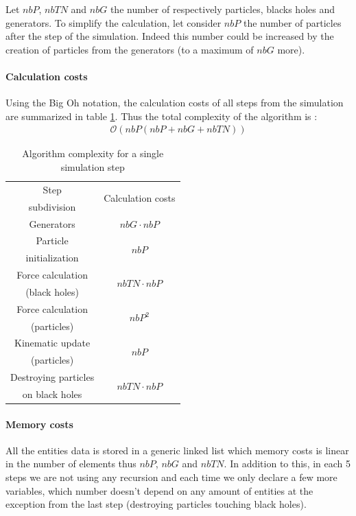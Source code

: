 \documentclass[a4paper]{article} %
\begin{document}
\begin{multicols*}{2}
Let $nbP$, $nbTN$ and $nbG$ the number of respectively particles, blacks holes and generators.
To simplify the calculation, let consider $nbP$ the number of particles after the step of the simulation.
Indeed this number could be increased by the creation of particles from the generators (to a maximum of $nbG$ more).



\paragraph{Calculation costs}
Using the Big Oh notation, the calculation costs of all steps from the simulation
are summarized in table \ref{tab-calc}. Thus the total complexity of the algorithm is :
\begin{align}
\mathcal{O}(nbP (nbP + nbG + nbTN))
\end{align}


\begin{table}[H]
\begin{center}
\begin{tabular}{|c|c|}
\hline
Step & \multicolumn{1}{|c|}{\multirow{2}{*}{Calculation costs}} \\
subdivision   &  \\
\hline
\hline
Generators &  $nbG\cdot nbP$\\
\hline
Particle  &       \multicolumn{1}{|c|}{\multirow{2}{*}{$nbP$}}\\
initialization &  \\
\hline
Force calculation  & \multicolumn{1}{|c|}{\multirow{2}{*}{$nbTN\cdot nbP$}}\\
(black holes) &  \\
\hline
Force calculation  & \multicolumn{1}{|c|}{\multirow{2}{*}{$nbP^2$}}\\
(particles) &  \\
\hline
Kinematic update  & \multicolumn{1}{|c|}{\multirow{2}{*}{$nbP$}}\\
(particles) &  \\
\hline
Destroying particles &  \multicolumn{1}{|c|}{\multirow{2}{*}{$nbTN\cdot nbP$}}\\
 on black holes &  \\
\hline
\end{tabular}
\end{center}
\caption{Algorithm complexity for a single simulation step}
\label{tab-calc}
\end{table}

\paragraph{Memory costs} All the entities data is stored in a generic linked list
which memory costs is linear in the number of elements thus $nbP$, $nbG$ and $nbTN$.
In addition to this, in each 5 steps we are not using any recursion and each time we only
declare a few more variables, which number doesn't depend on any amount of entities
at the exception from the last step (destroying particles touching black holes).


\end{multicols*}
\end{document}
